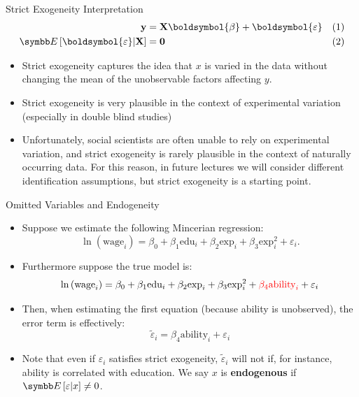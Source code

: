 \documentclass[aspectratio=169,11pt]{beamer}
\begin{document}
\begin{frame}{Strict Exogeneity Interpretation}
\begin{align*}
{\bf y} & =  {\bf X}\boldsymbol{\beta}+\boldsymbol{\varepsilon}	& (1)\\
\E\left[\boldsymbol{\varepsilon}|{\bf X}\right] & =  {\bf 0}						& (2)
\end{align*}
\begin{itemize}
	\item Strict exogeneity captures the idea that $x$ is varied in the data without changing the mean
	of the unobservable factors affecting $y$. 

	\medskip
	\item Strict exogeneity is very plausible in the context of experimental variation (especially in double blind studies) 

	\medskip
	\item Unfortunately, social scientists are often unable to rely on experimental variation, and strict exogeneity 
	is rarely plausible in the context of naturally occurring data. For this reason, in future lectures we will consider
	different identification assumptions, but strict exogeneity is a starting point.
\end{itemize}
\end{frame}


\begin{frame}{Omitted Variables and Endogeneity}
\begin{itemize}
	\item Suppose we estimate the following Mincerian regression:\[
\ln \left(\text{wage}_{i}\right)=\beta_{0}+\beta_{1}\text{edu}_{i}+\beta_{2}\text{exp}_{i}+\beta_{3}\text{exp}_{i}^{2}+\varepsilon_{i}.
\]

	\item Furthermore suppose the true model is:\[
\ln \left(\text{wage}_{i}\right)=\beta_{0}+\beta_{1}\text{edu}_{i}+\beta_{2}\text{exp}_{i}+\beta_{3}\text{exp}_{i}^{2}+ \textcolor{red}{\beta_4 \text{ability}_{i}} + \varepsilon_{i}
\]

	\item Then, when estimating the first equation (because ability is unobserved), the error term is effectively:\[
	\widetilde{\varepsilon}_{i} = \beta_4 \text{ability}_{i} + \varepsilon_{i}
\]


\item Note that even if $\varepsilon_{i}$ satisfies strict exogeneity, $\widetilde{\varepsilon}_{i}$ will not
 	if, for instance, ability is correlated with education. We say $x$ is {\bf endogenous} if $\E\left[\varepsilon|x\right]\ne 0$.


\end{itemize}
\end{frame}
\end{document}
